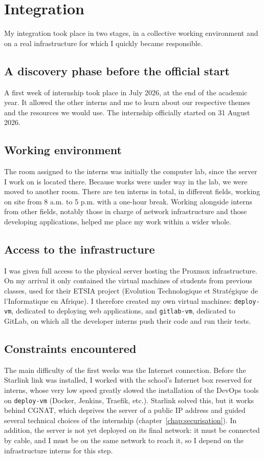 \section{Integration}
My integration took place in two stages, in a collective working environment and on a real infrastructure for which I quickly became responsible.

\subsection{A discovery phase before the official start}
A first week of internship took place in July 2026, at the end of the academic year. It allowed the other interns and me to learn about our respective themes and the resources we would use. The internship officially started on 31 August 2026.

\subsection{Working environment}
The room assigned to the interns was initially the computer lab, since the server I work on is located there. Because works were under way in the lab, we were moved to another room. There are ten interns in total, in different fields, working on site from 8 a.m. to 5 p.m. with a one-hour break. Working alongside interns from other fields, notably those in charge of network infrastructure and those developing applications, helped me place my work within a wider whole.

\subsection{Access to the infrastructure}
I was given full access to the physical server hosting the Proxmox infrastructure. On my arrival it only contained the virtual machines of students from previous classes, used for their ETSIA project (Evolution Technologique et Stratégique de l'Informatique en Afrique). I therefore created my own virtual machines: \texttt{deploy-vm}, dedicated to deploying web applications, and \texttt{gitlab-vm}, dedicated to GitLab, on which all the developer interns push their code and run their tests.

\subsection{Constraints encountered}
The main difficulty of the first weeks was the Internet connection. Before the Starlink link was installed, I worked with the school's Internet box reserved for interns, whose very low speed greatly slowed the installation of the DevOps tools on \texttt{deploy-vm} (Docker, Jenkins, Traefik, etc.). Starlink solved this, but it works behind CGNAT, which deprives the server of a public IP address and guided several technical choices of the internship (chapter~\ref{chap:securisation}). In addition, the server is not yet deployed on its final network: it must be connected by cable, and I must be on the same network to reach it, so I depend on the infrastructure interns for this step.

